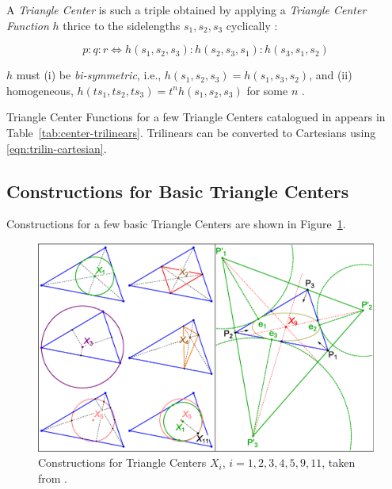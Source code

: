 A {\em Triangle Center} is such a triple obtained by applying a {\em Triangle Center Function} $h$ thrice to the sidelengths $s_1,s_2,s_3$ cyclically \cite{kimberling1993_rocky}:
 
\begin{equation}
\label{eqn:ftrilins}
    p:q:r {\iff} h(s_1,s_2,s_3):h(s_2,s_3,s_1):h(s_3,s_1,s_2)
\end{equation}

\noindent $h$ must (i) be {\em bi-symmetric}, i.e., $h(s_1,s_2,s_3)=h(s_1,s_3,s_2)$, and (ii) homogeneous, $h(t s_1, t s_2, t s_3)=t^n h(s_1,s_2,s_3)$ for some $n$ \cite{kimberling1993_rocky}.

Triangle Center Functions for a few Triangle Centers catalogued in \cite{mw} appears in Table~\ref{tab:center-trilinears}. Trilinears can be converted to Cartesians using \eqref{eqn:trilin-cartesian}.

\subsection{Constructions for Basic Triangle Centers}

Constructions for a few basic Triangle Centers are shown in Figure~\ref{fig:constructions}.

\begin{figure}
    \centering
    \includegraphics[width=\textwidth]{pics_1010_constr.eps}
    \caption{Constructions for Triangle Centers $X_i$, $i=1,2,3,4,5,9,11$, taken from \cite{reznik2020-intelligencer}.}
    \label{fig:constructions}
\end{figure}

